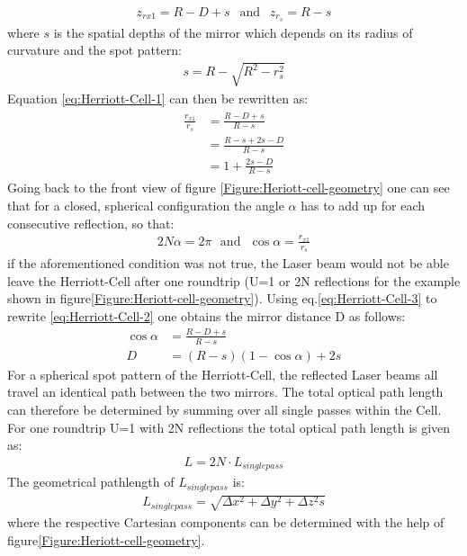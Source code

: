 \begin{align}
	z_{rx1}= R -D +s \ \ \text{   and } \ \ z_{r_s} = R-s
\end{align}
where $s$ is the spatial depths of the mirror which depends on its radius of curvature and the spot pattern:
\begin{align}
	s = R-\sqrt{R^2-r_s^2}
\end{align}
Equation \ref{eq:Herriott-Cell-1} can then be rewritten as:
\begin{align}
\begin{split}
	\frac{r_{x1}}{r_s}&=	\frac{R-D+s}{R-s}\\
	&= \frac{R-s+2s-D}{R-s}\\
	&=1 + \frac{2s-D}{R-s}
	\label{eq:Herriott-Cell-2}
\end{split}
\end{align}
Going back to the front view of figure \ref{Figure:Heriott-cell-geometry} one can see that for a closed, spherical configuration the 
angle $\alpha$ has to add up for each consecutive reflection, so that:
\begin{align}
	2N\alpha=2\pi \ \ \ \text{and} \ \ \ \cos{\alpha}=\frac{r_{x1}}{r_s}
	\label{eq:Herriott-Cell-3}
\end{align}
if the aforementioned condition was not true, the Laser beam would not be able leave the Herriott-Cell after one roundtrip (U=1 or 2N reflections for the example shown in figure\ref{Figure:Heriott-cell-geometry}). Using eq.\ref{eq:Herriott-Cell-3} to rewrite \ref{eq:Herriott-Cell-2} one obtains the mirror distance D as follows:
\begin{align}
	\cos{\alpha} &=	\frac{R-D+s}{R-s}\\
	D &= (R-s)(1-\cos{\alpha}) +2s
\end{align}
For a spherical spot pattern of the Herriott-Cell, the reflected Laser beams all travel an identical path between the two mirrors. The total optical path length can therefore be determined by summing over all single passes within the Cell. For one roundtrip U=1 with 2N reflections the total optical path length is given as:
\begin{align}
	L= 2N\cdot L_{single pass}
\end{align}
The geometrical pathlength of $L_{single pass}$ is:
\begin{align}
	L_{single pass} = \sqrt{\Delta x^2+\Delta y^2+\Delta z^2s}
\end{align}
where the respective Cartesian components can be determined with the help of figure\ref{Figure:Heriott-cell-geometry}.
